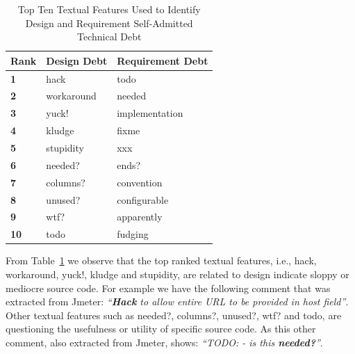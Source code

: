 \begin{table}[!thb]
    \begin{center}
        \caption{Top Ten Textual Features Used to Identify Design and Requirement Self-Admitted Technical Debt}
        \label{tbl:top_ten_features}
        \begin{tabular}{l| l l }
        \toprule
        \textbf{Rank} & \textbf{Design Debt} & \textbf{Requirement Debt}  \\
        \midrule
         \textbf{1}  & hack       &   todo              \\
         \textbf{2}  & workaround &   needed            \\
         \textbf{3}  & yuck!      &   implementation    \\
         \textbf{4}  & kludge     &   fixme             \\
         \textbf{5}  & stupidity  &   xxx               \\
         \textbf{6}  & needed?    &   ends?             \\
         \textbf{7}  & columns?   &   convention        \\
         \textbf{8}  & unused?    &   configurable      \\
         \textbf{9}  & wtf?       &   apparently        \\
         \textbf{10} & todo       &   fudging           \\
        \bottomrule
        \end{tabular}
    \end{center}    
\end{table}

From Table~\ref{tbl:top_ten_features} we observe that the top ranked textual features, i.e., hack, workaround, yuck!, kludge and stupidity, are related to design \SATD indicate sloppy or mediocre source code. For example we have the following comment that was extracted from Jmeter: \textit{``\textbf{Hack} to allow entire URL to be provided in host field''}. Other textual features such as needed?, columns?, unused?, wtf? and todo, are questioning the usefulness or utility of specific source code. As this other comment, also extracted from Jmeter, shows: \textit{``TODO: - is this \textbf{needed?}''}.


